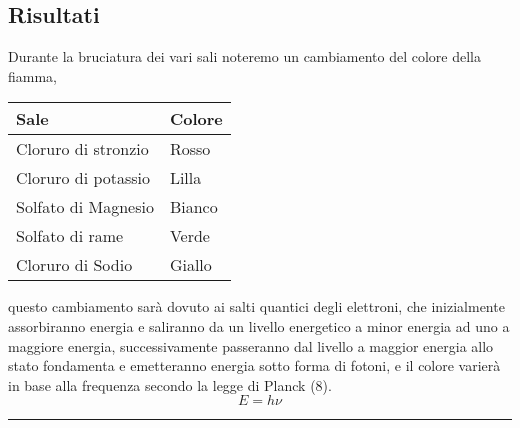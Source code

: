 \documentclass[a4paper,10pt]{article}
\begin{document}
	\subsection{Risultati}
	
	Durante la bruciatura dei vari sali noteremo un cambiamento del colore della fiamma, 
	\begin{table}[ht]
		\centering
		\begin{tabular}{|l|l|}
			\hline
			Sale                & Colore \\ \hline
			\rowcolor[HTML]{FD6864} 
			Cloruro di stronzio & Rosso  \\ \hline
			\rowcolor[HTML]{9698ED} 
			Cloruro di potassio & Lilla  \\ \hline
			Solfato di Magnesio & Bianco \\ \hline
			\rowcolor[HTML]{67FD9A} 
			Solfato di rame     & Verde  \\ \hline
			\rowcolor[HTML]{FFFE65} 
			Cloruro di Sodio    & Giallo \\ \hline
		\end{tabular}
		\label{table:ta}
	\end{table}
	questo cambiamento sarà dovuto ai salti quantici degli elettroni, che inizialmente assorbiranno energia e saliranno da un livello energetico a minor energia ad uno a maggiore energia, successivamente passeranno dal livello a maggior energia allo stato fondamenta e emetteranno energia sotto forma di fotoni, e il colore varierà in base alla frequenza secondo la legge di Planck (8).
	\begin{equation}
		E = h \nu
	\end{equation}
	\par\noindent\rule{\textwidth}{0.5pt}
	
	\break
	
	
	
	
	
	
	
	
	
	
	
\end{document}

